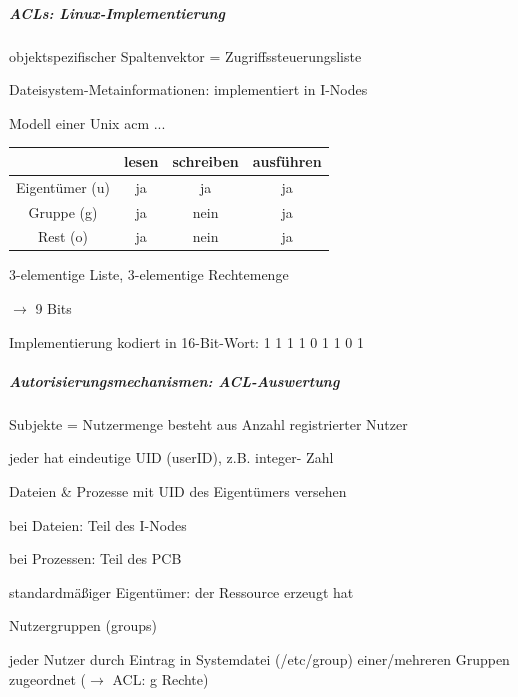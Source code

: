 \documentclass[a4paper]{article}
\begin{document}
\begin{multicols}{3}
    \subparagraph{ACLs: Linux-Implementierung}
    \begin{itemize*}
        \item objektspezifischer Spaltenvektor = Zugriffssteuerungsliste
        \item Dateisystem-Metainformationen: implementiert in I-Nodes
    \end{itemize*}

    Modell einer Unix acm ...
    \begin{tabular}{c|c|c|c}
                       & lesen & schreiben & ausführen \\\hline
        Eigentümer (u) & ja    & ja        & ja        \\
        Gruppe (g)     & ja    & nein      & ja        \\
        Rest (o)       & ja    & nein      & ja
    \end{tabular}
    \begin{itemize*}
        \item 3-elementige Liste, 3-elementige Rechtemenge
        \item[$\rightarrow$] 9 Bits
        \item Implementierung kodiert in 16-Bit-Wort: 1 1 1 1 0 1 1 0 1
    \end{itemize*}

    \subparagraph{Autorisierungsmechanismen: ACL-Auswertung}
    Subjekte = Nutzermenge besteht aus Anzahl registrierter Nutzer
    \begin{itemize*}
        \item jeder hat eindeutige UID (userID), z.B. integer- Zahl
        \item Dateien \& Prozesse mit UID des Eigentümers versehen
        \begin{itemize*}
            \item bei Dateien: Teil des I-Nodes
            \item bei Prozessen: Teil des PCB
            \item standardmäßiger Eigentümer: der Ressource erzeugt hat
        \end{itemize*}
    \end{itemize*}

    Nutzergruppen (groups)
    \begin{itemize*}
        \item jeder Nutzer durch Eintrag in Systemdatei (/etc/group) einer/mehreren Gruppen zugeordnet ($\rightarrow$ ACL: g Rechte)
    \end{itemize*}


\end{multicols}
\end{document}
